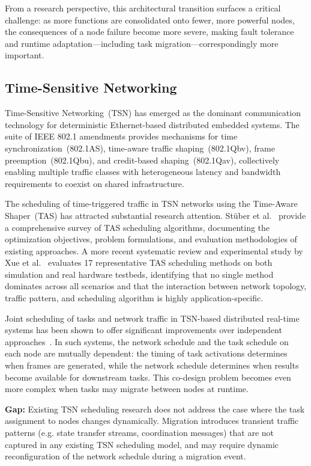 From a research perspective, this architectural transition surfaces a critical
challenge: as more functions are consolidated onto fewer, more powerful nodes, the
consequences of a node failure become more severe, making fault tolerance and runtime
adaptation---including task migration---correspondingly more important.

\subsection{Time-Sensitive Networking}
\label{subsec:rw_tsn}

Time-Sensitive Networking~(TSN) has emerged as the dominant communication technology
for deterministic Ethernet-based distributed embedded systems. The suite of IEEE 802.1
amendments provides mechanisms for time synchronization~(802.1AS), time-aware traffic
shaping~(802.1Qbv), frame preemption~(802.1Qbu), and credit-based
shaping~(802.1Qav), collectively enabling multiple traffic classes with heterogeneous
latency and bandwidth requirements to coexist on shared infrastructure.

The scheduling of time-triggered traffic in TSN networks using the Time-Aware
Shaper~(TAS) has attracted substantial research attention. St\"{u}ber et
al.~\cite{stuber2022} provide a comprehensive survey of TAS scheduling algorithms,
documenting the optimization objectives, problem formulations, and evaluation
methodologies of existing approaches. A more recent systematic review and experimental
study by Xue et al.~\cite{xue2024} evaluates 17 representative TAS scheduling methods
on both simulation and real hardware testbeds, identifying that no single method
dominates across all scenarios and that the interaction between network topology,
traffic pattern, and scheduling algorithm is highly application-specific.

Joint scheduling of tasks and network traffic in TSN-based distributed real-time
systems has been shown to offer significant improvements over independent
approaches~\cite{craciunas2016}. In such systems, the network schedule and the task
schedule on each node are mutually dependent: the timing of task activations
determines when frames are generated, while the network schedule determines when
results become available for downstream tasks. This co-design problem becomes even
more complex when tasks may migrate between nodes at runtime.

\textbf{Gap:} Existing TSN scheduling research does not address the case where the
task assignment to nodes changes dynamically. Migration introduces transient traffic
patterns (e.g. state transfer streams, coordination messages) that are not captured in
any existing TSN scheduling model, and may require dynamic reconfiguration of the
network schedule during a migration event.

